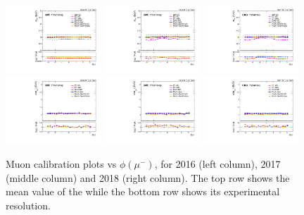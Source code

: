 \begin{figure}[!htb]
      \centering
      \captionsetup{justification=justified}
      \includegraphics[width=0.32\textwidth]{pics/muon_corr/muon_cal/2016/muN_phi_summary_mean.pdf}
      \includegraphics[width=0.32\textwidth]{pics/muon_corr/muon_cal/2017/muN_phi_summary_mean.pdf}
      \includegraphics[width=0.32\textwidth]{pics/muon_corr/muon_cal/2018/muN_phi_summary_mean.pdf}
      \includegraphics[width=0.32\textwidth]{pics/muon_corr/muon_cal/2016/muN_phi_summary_reso.pdf}
      \includegraphics[width=0.32\textwidth]{pics/muon_corr/muon_cal/2017/muN_phi_summary_reso.pdf}
      \includegraphics[width=0.32\textwidth]{pics/muon_corr/muon_cal/2018/muN_phi_summary_reso.pdf}
      \caption{Muon calibration plots vs $\phi(\mu^{-})$, for 2016 (left column), 2017 (middle column) and 2018 (right column).
               The top row shows the mean value of the \mmm while the bottom row shows its experimental resolution.}
      \label{fig:mucal_muN_phi}
\end{figure}


